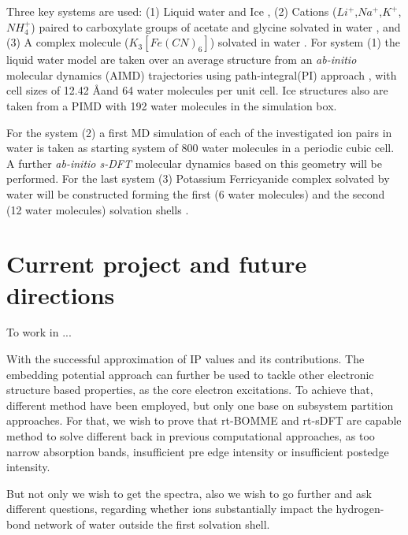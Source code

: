 \documentclass[notitlepage,12pt]{report}
\begin{document}
	Three key systems are used: (1) Liquid water\supercite{gaiduk2018electron} and Ice \supercite{bergmann2007nearest,zhovtobriukh2019x}, (2) Cations ($Li^{+}$,$Na^{+}$,$K^{+}$,$NH_4^{+}$) paired to carboxylate groups of acetate and glycine solvated in water \supercite{aziz2008cation}, and (3) A complex molecule ($K_3[Fe(CN)_6]$) solvated in water \supercite{zheng2018enabling}. For system (1) the liquid water model are taken over an average structure from an \textit{ab-initio} molecular dynamics (AIMD) trajectories using path-integral(PI) approach \supercite{gaiduk2018electron}, with cell sizes of 12.42 \AA and 64 water molecules per unit cell.  Ice structures also are taken from a PIMD with 192 water molecules in the simulation box\supercite{leetmaa2010theoretical}. 
	
	For the system (2) a first MD simulation of each of the investigated ion pairs in water is taken as starting system \supercite{aziz2008cation} of 800 water molecules in a periodic cubic cell. A further \textit{ab-initio s-DFT} molecular dynamics\supercite{genova2016avoiding} based on this geometry will be performed.  For the last system (3) Potassium Ferricyanide complex solvated by water will be constructed forming the first (6 water molecules) and the second (12 water molecules) solvation shells \supercite{uudsemaa2003density,seidel2011valence}. 
	
\section{Current project and future directions}
	
	To work in ...
	
	With the successful approximation of IP values and its contributions. The embedding potential approach can further be used to tackle other electronic structure based properties, as the core electron excitations. To achieve that, different method have been employed, but only one base on subsystem partition approaches. For that, we wish to prove that rt-BOMME and rt-sDFT are capable method to solve different back in previous computational approaches, as too narrow absorption bands, insufficient pre edge intensity or insufficient postedge intensity.
	
	But not only we wish to get the spectra, also we wish to go further and ask different questions, regarding whether ions 	substantially impact the hydrogen-bond network of water outside the first solvation shell.

\printbibliography
\end{document}
